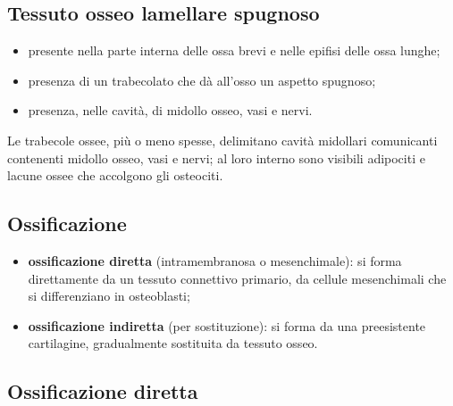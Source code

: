 \subsection{Tessuto osseo lamellare spugnoso}

\begin{itemize}
  \item presente nella parte interna delle ossa brevi e nelle epifisi delle ossa lunghe;
  \item presenza di un trabecolato che dà all'osso un aspetto spugnoso;
  \item presenza, nelle cavità, di midollo osseo, vasi e nervi.
\end{itemize}
Le trabecole ossee, più o meno spesse, delimitano cavità midollari comunicanti contenenti midollo osseo, vasi e nervi; al loro interno sono visibili adipociti e lacune ossee che accolgono gli osteociti.

\subsection{Ossificazione}

\begin{itemize}
  \item \textbf{ossificazione diretta} (intramembranosa o mesenchimale): si forma direttamente da un tessuto connettivo primario, da cellule mesenchimali che si differenziano in osteoblasti;
  \item \textbf{ossificazione indiretta} (per sostituzione): si forma da una preesistente cartilagine, gradualmente sostituita da tessuto osseo.
\end{itemize}

\subsection{Ossificazione diretta}

